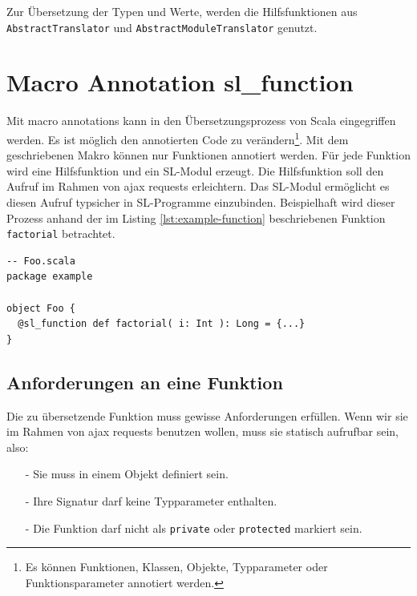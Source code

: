 \documentclass[12pt]{scrreprt}
\begin{document}

Zur Übersetzung der Typen und Werte, werden die Hilfsfunktionen aus \lstinline!AbstractTranslator! und \lstinline!AbstractModuleTranslator! genutzt.


\section{Macro Annotation sl\_function }
\label{sec:annotation-macro}

Mit macro annotations kann in den Übersetzungsprozess von Scala eingegriffen werden\cite{EPFL1}. Es ist möglich den annotierten Code zu verändern\footnote{Es können Funktionen, Klassen, Objekte, Typparameter oder Funktionsparameter annotiert werden.}. Mit dem geschriebenen Makro können nur Funktionen annotiert werden. Für jede Funktion wird eine Hilfsfunktion und ein \ac{SL}-Modul erzeugt. Die Hilfsfunktion soll den Aufruf im Rahmen von ajax requests erleichtern. Das \ac{SL}-Modul ermöglicht es diesen Aufruf typsicher in \ac{SL}-Programme einzubinden. Beispielhaft wird dieser Prozess anhand der im Listing \ref{lst:example-function} beschriebenen Funktion \lstinline!factorial! betrachtet.

\begin{lstlisting}[caption=Scala Beispielfunktion, label=lst:example-function, float=h]
-- Foo.scala
package example

object Foo {
  @sl_function def factorial( i: Int ): Long = {...}
}
\end{lstlisting}

\subsection{Anforderungen an eine Funktion}

Die zu übersetzende Funktion muss gewisse Anforderungen erfüllen. Wenn wir sie im Rahmen von ajax requests benutzen wollen, muss sie statisch aufrufbar sein, also:
\begin{itemize}
  \item[-]{Sie muss in einem Objekt definiert sein.}
  \item[-]{Ihre Signatur darf keine Typparameter enthalten.}
  \item[-]{Die Funktion darf nicht als \lstinline!private! oder \lstinline!protected! markiert sein.}
 \end{itemize}
\end{document}
